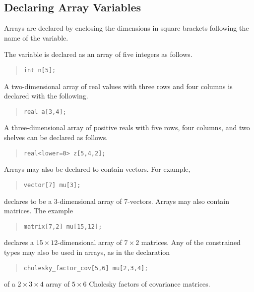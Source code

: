 \subsection{Declaring Array Variables}

Arrays are declared by enclosing the dimensions in square brackets
following the name of the variable.

The variable  is declared as an array of five integers as follows.
%
\begin{quote}
\begin{Verbatim}  
int n[5];
\end{Verbatim}
\end{quote}
% 
A two-dimensional array of real values with three rows and four columns is
declared with the following.
%
\begin{quote}
\begin{Verbatim}  
real a[3,4];
\end{Verbatim}
\end{quote}
% 
A three-dimensional array  of positive reals with five rows, four
columns, and two shelves can be declared as follows.
%
\begin{quote}
\begin{Verbatim} 
real<lower=0> z[5,4,2];
\end{Verbatim}
\end{quote}
%

Arrays may also be declared to contain vectors.  For example,
%
\begin{quote}
\begin{Verbatim}  
vector[7] mu[3];
\end{Verbatim}
\end{quote}
% 
declares  to be a 3-dimensional array of 7-vectors.  
Arrays may also contain matrices.  The example
%
\begin{quote}
\begin{Verbatim} 
matrix[7,2] mu[15,12];
\end{Verbatim}
\end{quote}
%
declares a $15 \times 12$-dimensional array of $7 \times 2$ matrices.
Any of the constrained types may also be used in arrays, as in the
declaration
%
\begin{quote}
\begin{Verbatim}  
cholesky_factor_cov[5,6] mu[2,3,4];
\end{Verbatim}
\end{quote}
% 
of a $2 \times 3 \times 4$ array of $5 \times 6$ Cholesky factors of
covariance matrices.

